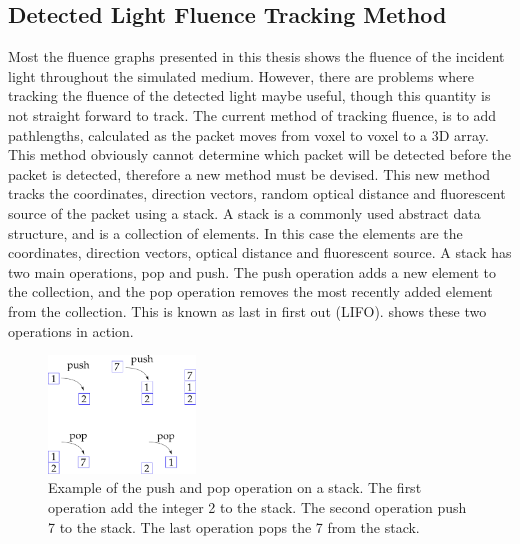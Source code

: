 \begin{appendices}
\chapter{Detected Light Fluence Tracking Method}
\label{app:lightdect}

Most the fluence graphs presented in this thesis shows the fluence of the incident light throughout the simulated medium.
However, there are problems where tracking the fluence of the detected light maybe useful, though this quantity is not straight forward to track.
The current method of tracking fluence, is to add pathlengths, calculated as the packet moves from voxel to voxel to a 3D array. 
This method obviously cannot determine which packet will be detected before the packet is detected, therefore a new method must be devised.
This new method tracks the coordinates, direction vectors, random optical distance and fluorescent source of the packet using a stack.
A stack is a commonly used abstract data structure, and is a collection of elements.
In this case the elements are the coordinates, direction vectors, optical distance and fluorescent source.
A stack has two main operations, pop and push.
The push operation adds a new element to the collection, and the pop operation removes the most recently added element from the collection.
This is known as last in first out (LIFO).
 shows these two operations in action.

\begin{figure}[!htpb]
	\centering
	\includegraphics[width=0.35\textwidth]{stack.pdf}
	\caption{Example of the push and pop operation on a stack. The first operation add the integer 2 to the stack. The second operation push 7 to the stack. The last operation pops the 7 from the stack.}
	\label{fig:stack}
\end{figure}


\end{appendices}
